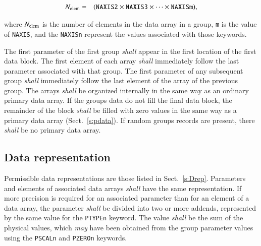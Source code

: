 \documentclass[onecolumn]{aa}
\begin{document}
\begin{eqnarray}  
   \mbox{$N_{\rm elem}$} &=&  
                     (\mbox{{\tt NAXIS2}} \times \mbox{{\tt NAXIS3}} 
                     \times  \cdots \times \mbox{{\tt NAXISm}}),
\end{eqnarray}

\noindent
  where $N_{\rm elem}$ is the number of elements in the data array in a group,
  {\tt m} is the value of {\tt NAXIS}, 
  and the {\tt NAXISn} represent 
  the values associated with those keywords.

  The first parameter of the first group {\em shall} appear in the first
  location of the first data block.  The first element of each array {\em shall}
  immediately follow the last parameter associated with that group.
  The first parameter of any subsequent group {\em shall} immediately follow
  the last element of the array of the previous group.  The arrays {\em shall}
  be organized internally in the same way as an 
  ordinary primary data array. 
  If the groups data do not fill the final data block, the remainder 
  of the block {\em shall} be filled with zero values in the same
  way as a primary data array (Sect.\ \ref{s:pdata}). 
  If random groups records are present, there {\em shall} be no primary data 
  array.
  
\subsection{Data representation}
  
  Permissible data representations are those listed in 
  Sect.\ \ref{s:Drep}.  Parameters and elements 
  of associated data
  arrays {\em shall} have the same representation.  If more precision
  is required for an associated parameter than for an element of a data
  array, the parameter {\em shall} be divided into two or more 
  addends, represented
  by the same value for the {\tt PTYPEn} keyword. 
  The value {\em shall} be the sum of the physical values, 
  which {\em may} have been obtained 
  from the group parameter values 
  using 
  the {\tt PSCALn} and {\tt PZEROn} keywords.
  
\end{document}
